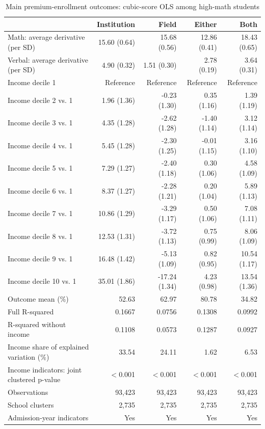 \begin{table}[!htbp]\centering
\caption{Main premium-enrollment outcomes: cubic-score OLS among high-math students}
\label{tab:high-math-premium-cubic-income-main}
\small
\begin{tabular}{lrrrr}\hline\hline
 & Institution & Field & Either & Both \\ \hline
Math: average derivative (per SD) & 15.60 (0.64) & 15.68 (0.56) & 12.86 (0.41) & 18.43 (0.65) \\
Verbal: average derivative (per SD) & 4.90 (0.32) & 1.51 (0.30) & 2.78 (0.19) & 3.64 (0.31) \\
Income decile 1 & Reference & Reference & Reference & Reference \\
Income decile 2 vs. 1 & 1.96 (1.36) & -0.23 (1.30) & 0.35 (1.16) & 1.39 (1.19) \\
Income decile 3 vs. 1 & 4.35 (1.28) & -2.62 (1.28) & -1.40 (1.14) & 3.12 (1.14) \\
Income decile 4 vs. 1 & 5.45 (1.28) & -2.30 (1.25) & -0.01 (1.15) & 3.16 (1.10) \\
Income decile 5 vs. 1 & 7.29 (1.27) & -2.40 (1.18) & 0.30 (1.06) & 4.58 (1.09) \\
Income decile 6 vs. 1 & 8.37 (1.27) & -2.28 (1.21) & 0.20 (1.04) & 5.89 (1.13) \\
Income decile 7 vs. 1 & 10.86 (1.29) & -3.29 (1.17) & 0.50 (1.06) & 7.08 (1.11) \\
Income decile 8 vs. 1 & 12.53 (1.31) & -3.72 (1.13) & 0.75 (0.99) & 8.06 (1.09) \\
Income decile 9 vs. 1 & 16.48 (1.42) & -5.13 (1.09) & 0.82 (0.95) & 10.54 (1.17) \\
Income decile 10 vs. 1 & 35.01 (1.86) & -17.24 (1.34) & 4.23 (0.98) & 13.54 (1.36) \\
\hline
Outcome mean (\%) & 52.63 & 62.97 & 80.78 & 34.82 \\
Full R-squared & 0.1667 & 0.0756 & 0.1308 & 0.0992 \\
R-squared without income & 0.1108 & 0.0573 & 0.1287 & 0.0927 \\
Income share of explained variation (\%) & 33.54 & 24.11 & 1.62 & 6.53 \\
Income indicators: joint clustered p-value & $<$0.001 & $<$0.001 & $<$0.001 & $<$0.001 \\
Observations & 93,423 & 93,423 & 93,423 & 93,423 \\
School clusters & 2,735 & 2,735 & 2,735 & 2,735 \\
Admission-year indicators & Yes & Yes & Yes & Yes \\

\end{tabular}
\end{table}
